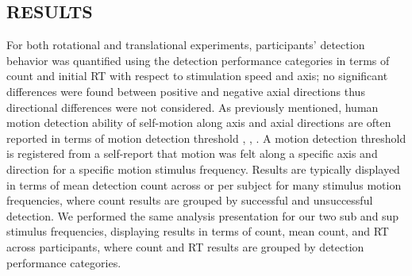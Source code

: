 \documentclass{ieeeaccess}
\begin{document}
\subsection{RESULTS}
For both rotational and translational experiments, participants’ detection behavior was quantified using the detection performance categories in terms of count and initial RT with respect to stimulation speed and axis; no significant differences were found between positive and negative axial directions thus directional differences were not considered. As previously mentioned, human motion detection ability of self-motion along axis and axial directions are often reported in terms of motion detection threshold \cite{Valko_2012_Vestibular}, \cite{Hartmann_2014_Direction}, \cite{Karmali_2017_Multivariate}. A motion detection threshold is registered from a self-report that motion was felt along a specific axis and direction for a specific motion stimulus frequency. Results are typically displayed in terms of mean detection count across or per subject for many stimulus motion frequencies, where count results are grouped by successful and unsuccessful detection. We performed the same analysis presentation for our two sub and sup stimulus frequencies, displaying results in terms of count, mean count, and RT across participants, where count and RT results are grouped by detection performance categories.
\end{document}
